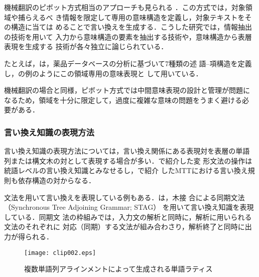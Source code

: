 機械翻訳のピボット方式相当のアプローチも見られる
\cite{meteer:88,huang:96,brun:03}．この方式では，対象領域や捕らえるべ
き情報を限定して専用の意味構造を定義し，対象テキストをその構造に当ては
めることで言い換えを生成する．こうした研究では，情報抽出の技術を用いて
入力から意味構造の要素を抽出する技術や，意味構造から表層表現を生成する
技術が各々独立に論じられている．

たとえば，は，薬品データベースの分析に基づいて7種類の述
語--項構造を定義し，の例のようにこの領域専用の意味表現と
して用いている．


機械翻訳の場合と同様，ピボット方式では中間意味表現の設計と管理が問題に
なるため，領域を十分に限定して，過度に複雑な意味の問題をうまく避ける必
要がある．

\subsubsection{言い換え知識の表現方法}
\label{sssec:representation}

言い換え知識の表現方法については，言い換え関係にある表現対を表層の単語
列または構文木の対として表現する場合が多い．で紹介した変
形文法の操作は統語レベルの言い換え知識とみなせるし，で紹介
したMTTにおける言い換え規則も依存構造の対からなる．

文法を用いて言い換えを表現している例もある．は，木接
合による同期文法（Synchronous Tree Adjoining Grammar; STAG）
\cite{abeille:90,shieber:90}を用いて言い換え知識を表現している．同期文
法の枠組みでは，入力文の解析と同時に，解析に用いられる文法のそれぞれに
対応（同期）する文法が組み合わさり，解析終了と同時に出力が得られる．

\begin{figure}[t]
\begin{center}
\leavevmode
\texttt{[image: clip002.eps]}
\caption{複数単語列アラインメントによって生成される単語ラティス\cite{pang:03}}
\label{fig:lattice}
\end{center}
\end{figure}


